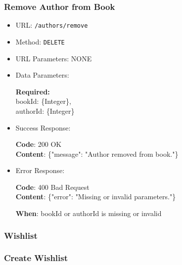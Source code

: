 \subsubsection*{Remove Author from Book}

\begin{itemize}
    \item URL: \texttt{/authors/remove}
    \item Method: \texttt{DELETE}
    \item URL Parameters: NONE
    \item Data Parameters:

    \textbf{Required:} \\
    bookId: \{Integer\}, \\
    authorId: \{Integer\}

    \item Success Response: \newline

    \textbf{Code}: 200 OK \\
    \textbf{Content}: \{"message": "Author removed from book."\}

    \item Error Response: \newline

    \textbf{Code}: 400 Bad Request \\
    \textbf{Content}: \{"error": "Missing or invalid parameters."\}

    \textbf{When}: bookId or authorId is missing or invalid
\end{itemize}

\subsubsection*{Wishlist}

\subsubsection*{Create Wishlist}

